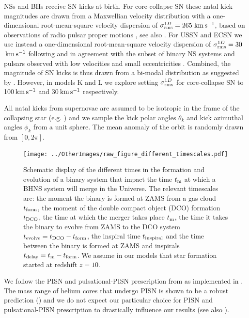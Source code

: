\documentclass[twocolumn]{aastex63}
\newcommand\bhnsSingle{BHNS\xspace}
\newcommand{\kms}{\ensuremath{\,\rm{km}\,\rm{s}^{-1}}\xspace}
\newcommand{\tdelay}{\ensuremath{{t}_{\rm{delay}}}\xspace}
\newcommand{\tDCO}{\ensuremath{{t}_{\rm{DCO}}}\xspace}
\newcommand{\tevolve}{\ensuremath{{t}_{\rm{evolve}}}\xspace}
\newcommand{\tform}{\ensuremath{{t}_{\rm{form}}}\xspace}
\newcommand{\tmerger}{\ensuremath{{t}_{\rm{m}}}\xspace}
\newcommand{\tinspiral}{\ensuremath{{t}_{\rm{inspiral}}}\xspace}
\begin{document}
NSs and BHs receive \ac{SN}  kicks at birth.  
	For core-collapse \ac{SN}  these natal kick magnitudes are drawn from a Maxwellian velocity distribution with a one-dimensional root-mean-square velocity dispersion of $\sigma_{\rm{rms}}^{1D} = 265$\kms, based on observations of radio pulsar proper motions  \citep{2005MNRAS.360..974H}, see also \citet{1994Natur.369..127L}.
For \ac{USSN} and \ac{ECSN}  we use instead  a  one-dimensional root-mean-square velocity dispersion of  $\sigma_{\rm{rms}}^{1D} = 30$\kms  following \citet{2002ApJ...571L..37P,2004ApJ...612.1044P} and in agreement with the subset of binary \ac{NS} systems and pulsars observed with low  velocities and small eccentricities  \citep{2010ApJ...719..722S,2016MNRAS.456.4089B, 2002ApJ...571..906B,2017ApJ...846..170T, 2017A&A...608A..57V, 2017JApA...38...40V}. 
Combined, the magnitude of  \ac{SN}  kicks is thus drawn from a bi-modal distribution as suggested by \citet{1975Natur.253..698K,2002ApJ...568..289A}.
However, in models K and L we explore setting $\sigma_{\rm{rms}}^{1D}$ for core-collapse \ac{SN} to 100\kms and 30\kms respectively. 


All natal kicks from supernovae are assumed to be isotropic in the frame of the collapsing star (e.g. \citealt{2013A&A...552A.126W})  and we sample the kick polar angles $\theta_k$ and kick azimuthal angles $\phi_k$ from a unit sphere. The mean anomaly of the orbit is randomly drawn from $[0, 2\pi]$. 


\begin{figure}
		\texttt{[image: ../OtherImages/raw\_figure\_different\_timescales.pdf]} %
    \caption{Schematic display of the different times in the formation and evolution of a binary system that impact the time \tmerger at which a  \bhnsSingle system will merge in the Universe. The relevant timescales are:  the moment the binary is formed at ZAMS from a gas cloud \tform, the moment of the double compact object (\ac{DCO}) formation \tDCO, the time at which the merger takes place \tmerger, the time it takes the binary to evolve from ZAMS to the \ac{DCO} system $\tevolve = \tDCO - \tform$, the inspiral time \tinspiral and the time between the binary is formed at ZAMS and inspirals $\tdelay = \tmerger - \tform$. We assume in our models that star formation started at redshift $z = 10$.   } 
   \label{fig:timescalesEvolution}
\end{figure}
%


We follow the \ac{PISN} and pulsational-\ac{PISN}  prescription from \citet{2019ApJ...882...36M} as implemented in \citet{2019arXiv190402821S}. 
The mass range of helium cores that undergo \ac{PISN} is shown to be a robust prediction (\citealt{2019ApJ...887...53F}) and we do not expect our particular choice for \ac{PISN} and pulsational-\ac{PISN} prescription to drastically influence our results (see also \citealt{2019arXiv190402821S}).  
\end{document}
